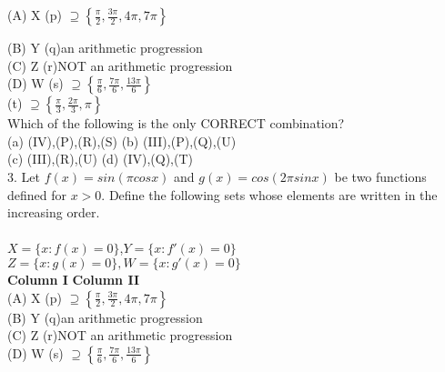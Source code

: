 \documentclass[journal,12pt,twocolumn]{IEEEtran}
\theoremstyle{remark}
\begin{document}
(A) X \hspace{42pt} (p) $\supseteq \left\{ \frac{\pi}{2}, \frac{3\pi}{2}, 4\pi, 7\pi \right\}$


(B) Y \hspace{42pt} (q)an arithmetic progression
\\

(C) Z \hspace{45pt} (r)NOT an arithmetic progression
\\

(D) W\hspace{45pt}  (s) $\supseteq\left\{\frac{\pi}{6},\frac{7\pi}{6},\frac{13\pi}{6}\right\}$
\\

\hspace{75pt} (t) $\supseteq\left\{\frac{\pi}{3},\frac{2\pi}{3},\pi\right\}$
\\

Which of the following is the only CORRECT combination?
\\
(a) (IV),(P),(R),(S) \hspace{50pt} (b) (III),(P),(Q),(U)\\
(c) (III),(R),(U) \hspace{65pt} (d) (IV),(Q),(T)
\\

3. Let $f(x)=sin(\pi cosx)$ and $g(x)=cos(2\pi sinx)$ be two functions defined for $x>0$. Define the following sets whose elements are written in the increasing order.\hfill{}
\\\\$X=\{x:f(x)=0\}$,$Y=\{x:f'(x)=0\}$\\
$Z=\{x:g(x)=0\}, W=\{x:g'(x)=0\}$
\\

\textbf{Column I}  \hspace{2cm}\textbf{Column II}
\\

(A) X \hspace{42pt} (p)  $\supseteq\left\{\frac{\pi}{2},\frac{3\pi}{2},4\pi,7\pi\right\}$
\\

(B) Y \hspace{42pt} (q)an arithmetic progression
\\

(C) Z \hspace{45pt} (r)NOT an arithmetic progression
\\

(D) W\hspace{45pt}  (s) $\supseteq\left\{\frac{\pi}{6},\frac{7\pi}{6},\frac{13\pi}{6}\right\}$
\\
\end{document}
